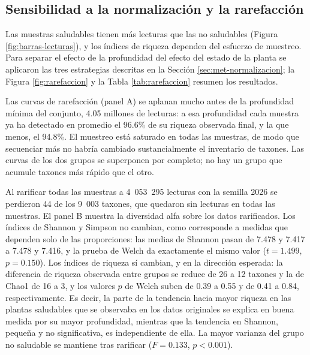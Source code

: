 \subsection{Sensibilidad a la normalización y la rarefacción}
\label{sec:res-normalizacion}

Las muestras saludables tienen más lecturas que las no saludables (Figura \ref{fig:barras-lecturas}),
y los índices de riqueza dependen del esfuerzo de muestreo. Para separar el efecto de la profundidad
del efecto del estado de la planta se aplicaron las tres estrategias descritas en la Sección
\ref{sec:met-normalizacion}; la Figura \ref{fig:rarefaccion} y la Tabla \ref{tab:rarefaccion}
resumen los resultados.

Las curvas de rarefacción (panel A) se aplanan mucho antes de la profundidad mínima del conjunto,
4.05 millones de lecturas: a esa profundidad cada muestra ya ha detectado en promedio el 96.6\% de
su riqueza observada final, y la que menos, el 94.8\%. El muestreo está saturado en todas las
muestras, de modo que secuenciar más no habría cambiado sustancialmente el inventario de taxones. Las
curvas de los dos grupos se superponen por completo; no hay un grupo que acumule taxones más rápido
que el otro.

Al rarificar todas las muestras a 4~053~295 lecturas con la semilla 2026 se perdieron 44 de los
9~003 taxones, que quedaron sin lecturas en todas las muestras. El panel B muestra la diversidad alfa
sobre los datos rarificados. Los índices de Shannon y Simpson no cambian, como corresponde a
medidas que dependen solo de las proporciones: las medias de Shannon pasan de 7.478 y 7.417 a 7.478 y
7.416, y la prueba de Welch da exactamente el mismo valor ($t = 1.499$, $p = 0.150$). Los índices
de riqueza sí cambian, y en la dirección esperada: la diferencia de riqueza observada entre grupos
se reduce de 26 a 12 taxones y la de Chao1 de 16 a 3, y los valores $p$ de Welch suben de 0.39 a
0.55 y de 0.41 a 0.84, respectivamente. Es decir, la parte de la tendencia hacia mayor riqueza en las
plantas saludables que se observaba en los datos originales se explica en buena medida por su mayor
profundidad, mientras que la tendencia en Shannon, pequeña y no significativa, es independiente de
ella. La mayor varianza del grupo no saludable se mantiene tras rarificar ($F = 0.133$, $p < 0.001$).


